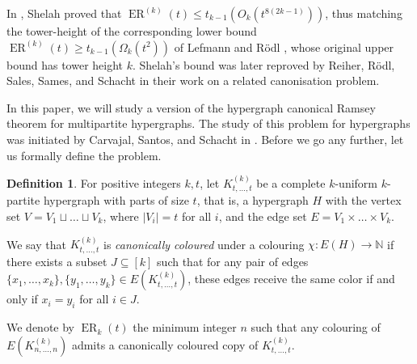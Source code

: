 \documentclass[10pt,a4paper]{article}
\theoremstyle{plain}
\theoremstyle{definition}
\newtheorem{definition}{Definition}
\newcommand{\N}{\mathbb{N}}
\newcommand{\erado}[2]{\operatorname{ER}_{#1}(#2)}
\newcommand{\hyperado}[2]{\operatorname{ER}^{(#1)}(#2)}
\newcommand{\cmpltt}[3]{K^{(#1)}_{#2,\dots,#3}}
\newcommand{\cmplt}[2]{\cmpltt{#1}{#2}{#2}}
\begin{document}
In \cite{shelah1996finite}, Shelah proved that $\hyperado{k}{t}\le t_{k-1}(O_k(t^{8(2k-1)}))$, thus matching the tower-height of the corresponding lower bound $\hyperado{k}{t}\ge t_{k-1}(\Omega_k(t^2))$ of Lefmann and R\"odl \cite{lefmann1995erdHos}, whose original upper bound has tower height $k$. Shelah's bound was later reproved by Reiher, R\"odl, Sales, Sames, and Schacht \cite{reiher2022quantitative} in their work on a related canonisation problem.

In this paper, we will study a version of the hypergraph canonical Ramsey theorem for multipartite hypergraphs. The study of this problem for hypergraphs was initiated by Carvajal, Santos, and Schacht in \cite{carvajal2024canonical}. Before we go any further, let us formally define the problem. 

\begin{definition}\label{def-multierado}\sloppy
    For positive integers $k,t$, let $\cmplt{k}{t}$ be a complete $k$-uniform $k$-partite hypergraph with parts of size $t$, that is, a hypergraph $H$ with the vertex set $V=V_1\sqcup\dots\sqcup V_k$, where $|V_i|=t$ for all $i$, and the edge set $E=V_1\times\dots\times V_k$.

    We say that $\cmplt{k}{t}$ is \emph{canonically coloured} under a colouring $\chi:E(H)\to\N$ if there exists a subset $J\subseteq[k]$ such that for any pair of edges $\{x_1, \dots, x_k\},\{y_1, \dots, y_k\}\in E(\cmplt{k}{t})$, these edges receive the same color if and only if $x_i=y_i$ for all $i\in J$.
    
    We denote by $\erado{k}{t}$ the minimum integer $n$ such that any colouring of $E(\cmplt{k}{n})$ admits a canonically coloured copy of $\cmplt{k}{t}$.
\end{definition}
\end{document}
